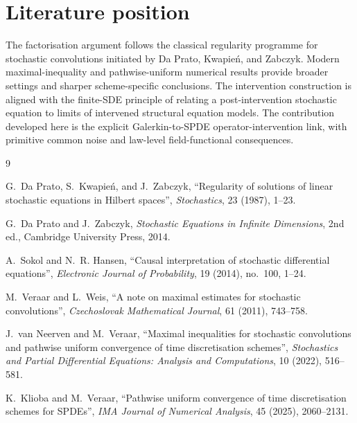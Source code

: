 \documentclass[11pt]{article}
\theoremstyle{remark}
\newcommand{\1}{\mathbf 1}
\begin{document}
\section*{Literature position}

The factorisation argument follows the classical regularity programme for stochastic convolutions initiated by Da Prato, Kwapie\'n, and Zabczyk.  Modern maximal-inequality and pathwise-uniform numerical results provide broader settings and sharper scheme-specific conclusions.  The intervention construction is aligned with the finite-SDE principle of relating a post-intervention stochastic equation to limits of intervened structural equation models.  The contribution developed here is the explicit Galerkin-to-SPDE operator-intervention link, with primitive common noise and law-level field-functional consequences.

\begin{thebibliography}{9}

G.~Da Prato, S.~Kwapie\'n, and J.~Zabczyk,
``Regularity of solutions of linear stochastic equations in Hilbert spaces'',
\emph{Stochastics}, 23 (1987), 1--23.

G.~Da Prato and J.~Zabczyk,
\emph{Stochastic Equations in Infinite Dimensions}, 2nd ed.,
Cambridge University Press, 2014.

A.~Sokol and N.~R. Hansen,
``Causal interpretation of stochastic differential equations'',
\emph{Electronic Journal of Probability}, 19 (2014), no.~100, 1--24.

M.~Veraar and L.~Weis,
``A note on maximal estimates for stochastic convolutions'',
\emph{Czechoslovak Mathematical Journal}, 61 (2011), 743--758.

J.~van Neerven and M.~Veraar,
``Maximal inequalities for stochastic convolutions and pathwise uniform convergence of time discretisation schemes'',
\emph{Stochastics and Partial Differential Equations: Analysis and Computations}, 10 (2022), 516--581.

K.~Klioba and M.~Veraar,
``Pathwise uniform convergence of time discretisation schemes for SPDEs'',
\emph{IMA Journal of Numerical Analysis}, 45 (2025), 2060--2131.

\end{thebibliography}
\end{document}
